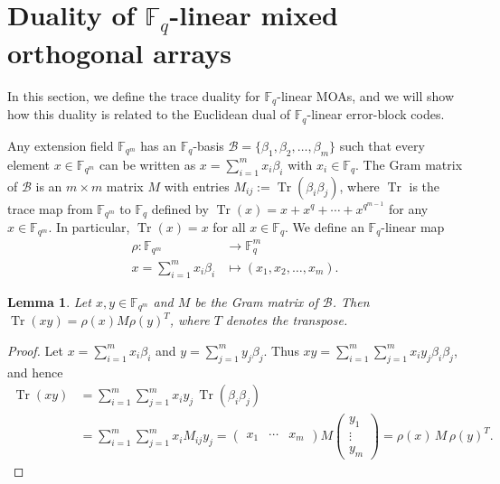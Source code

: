 \documentclass[11pt]{article}
\newtheorem{Definition and Notation}[Theorem]{Definition and Notation}
\newtheorem{Lemma}[Theorem]{Lemma}
\begin{document}
\section{Duality of $\mathbb F_q$-linear mixed orthogonal arrays}\label{S:1-3}
In this section, we define the trace duality for $\mathbb F_q$-linear MOAs, and we will show how this duality is related to the Euclidean dual of $\mathbb F_q$-linear error-block codes. 

Any extension field $\mathbb{F}_{q^{m}}$ has an $\mathbb F_q$-basis $\mathcal{B} = \{\beta_1, \beta_2,\ldots, \beta_m\}$ such that every element $x\in \mathbb F_{q^{m}}$ can be written as $x = \sum_{i=1}^{m} x_i \beta_i$ with $x_i\in \mathbb F_q$. The Gram matrix of $\mathcal{B}$ is an $m\times m$ matrix $M$ with entries  $M_{ij}:=\operatorname{Tr}(\beta_i\beta_j)$, where $ \operatorname{Tr} $ is the trace map  from $\mathbb{F}_{q^{m}}$ to $\mathbb{F}_q $ defined by $\operatorname{Tr}(x) =  x+ x^q + \cdots + x^{q^{m-1}}$ for any $x\in \mathbb F_{q^m}$. In particular, $\operatorname{Tr}(x)=x$ for all $x\in\mathbb F_q$. We define an $\mathbb F_q$-linear map
\begin{align}\label{rho-map}
 \rho : \mathbb{F}_{q^m} &\longrightarrow \mathbb F_q^{m}  \\ 
 x = \sum_{i=1}^{m} x_i \beta_i&\longmapsto (x_1, x_2, \dots, x_m)\nonumber.
\end{align}

\begin{Lemma}
Let $x, y\in \mathbb F_{q^m}$ and $M$ be the Gram matrix of $\mathcal{B}$. Then $\operatorname{Tr}(xy)=\rho(x) M \rho(y)^{T}$, where $T$ denotes the transpose.
\end{Lemma}
\begin{proof}
Let $x=\sum_{i=1}^m x_i\beta_i$ and $ y=\sum_{j=1}^m y_j\beta_j$. Thus $xy=\sum_{i=1}^m\sum_{j=1}^m x_iy_j\beta_i\beta_j$, and hence
\begin{align*}
\operatorname{Tr}(xy)
&=\sum_{i=1}^{m}\sum_{j=1}^{m} x_i y_j\,\operatorname{Tr}(\beta_i\beta_j)\\
&=\sum_{i=1}^{m}\sum_{j=1}^{m} x_i M_{ij} y_j=\begin{pmatrix} x_1 & \cdots & x_m \end{pmatrix}
M
\begin{pmatrix} y_1 \\ \vdots \\ y_m \end{pmatrix}
=\rho(x)\,M\,\rho(y)^T .
\end{align*}
\end{proof}
\end{document}
